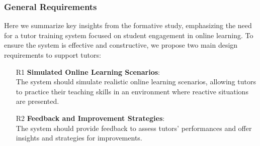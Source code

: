 \subsubsection{General Requirements}
Here we summarize key insights from the formative study, emphasizing the need for a tutor training system focused on student engagement in online learning. To ensure the system is effective and constructive, we propose two main design requirements to support tutors:
\begin{enumerate}%
    \item[R1] \textbf{Simulated Online Learning Scenarios}: \\
    The system should simulate realistic online learning scenarios, allowing tutors to practice their teaching skills in an environment where reactive situations are presented.

    \item[R2] \textbf{Feedback and Improvement Strategies}: \\
    The system should provide feedback to assess tutors' performances and offer insights and strategies for improvements.
\end{enumerate}



